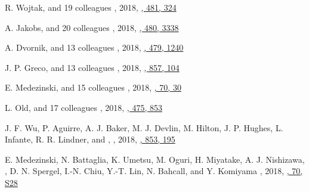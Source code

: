 \begin{etaremune}
\item
R. Wojtak, and 19 colleagues
,
2018, \href{https://ui.adsabs.harvard.edu/abs/2018MNRAS.481..324W}{\mnras, 481, 324}

\item
A. Jakobs, and 20 colleagues
,
2018, \href{https://ui.adsabs.harvard.edu/abs/2018MNRAS.480.3338J}{\mnras, 480, 3338}

\item
A. Dvornik, and 13 colleagues
,
2018, \href{https://ui.adsabs.harvard.edu/abs/2018MNRAS.479.1240D}{\mnras, 479, 1240}

\item
J. P. Greco, and 13 colleagues
,
2018, \href{https://ui.adsabs.harvard.edu/abs/2018ApJ...857..104G}{\apj, 857, 104}

\item
E. Medezinski, and 15 colleagues
,
2018, \href{https://ui.adsabs.harvard.edu/abs/2018PASJ...70...30M}{\pasj, 70, 30}

\item
L. Old, and 17 colleagues
,
2018, \href{https://ui.adsabs.harvard.edu/abs/2018MNRAS.475..853O}{\mnras, 475, 853}

\item
J. F. Wu, P. Aguirre, A. J. Baker, M. J. Devlin, M. Hilton, J. P. Hughes, L. Infante, R. R. Lindner, and \myself,
,
2018, \href{https://ui.adsabs.harvard.edu/abs/2018ApJ...853..195W}{\apj, 853, 195}

\item
E. Medezinski, N. Battaglia, K. Umetsu, M. Oguri, H. Miyatake, A. J. Nishizawa, \myself, D. N. Spergel, I.-N. Chiu, Y.-T. Lin, N. Bahcall, and Y. Komiyama
,
2018, \href{https://ui.adsabs.harvard.edu/abs/2018PASJ...70S..28M}{\pasj, 70, S28}


\end{etaremune}
